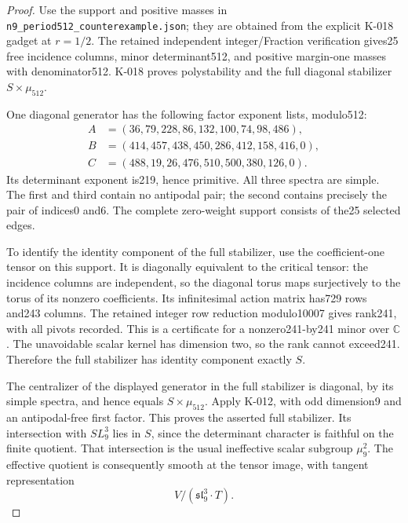 \begin{proof}
Use the support and positive masses in
\texttt{n9\_period512\_counterexample.json}; they are obtained from
the explicit K-018 gadget at $r=1/2$.  The retained independent
integer/Fraction verification gives25 free incidence columns,
minor determinant512, and positive margin-one masses with
denominator512.  K-018 proves polystability and the full
diagonal stabilizer $S\times\mu_{512}$.

One diagonal generator has the following factor exponent lists,
modulo512:
\[
\begin{aligned}
A&=(36,79,228,86,132,100,74,98,486),\\
B&=(414,457,438,450,286,412,158,416,0),\\
C&=(488,19,26,476,510,500,380,126,0).
\end{aligned}
\]
Its determinant exponent is219, hence primitive.  All three
spectra are simple.  The first and third contain no antipodal
pair; the second contains precisely the pair of indices0 and6.
The complete zero-weight support consists of the25 selected edges.

To identify the identity component of the full stabilizer, use
the coefficient-one tensor on this support.  It is diagonally
equivalent to the critical tensor: the incidence columns are
independent, so the diagonal torus maps surjectively to the torus
of its nonzero coefficients.  Its infinitesimal action matrix
has729 rows and243 columns.  The retained integer row reduction
modulo10007 gives rank241, with all pivots recorded.  This is a
certificate for a nonzero241-by241 minor over $\mathbb C$.
The unavoidable scalar kernel has dimension two, so the rank
cannot exceed241.  Therefore the full stabilizer has identity
component exactly $S$.

The centralizer of the displayed generator in the full stabilizer
is diagonal, by its simple spectra, and hence equals
$S\times\mu_{512}$.  Apply K-012, with odd dimension9 and an
antipodal-free first factor.  This proves the asserted full
stabilizer.  Its intersection with $SL_9^3$ lies in $S$, since
the determinant character is faithful on the finite quotient.
That intersection is the usual ineffective scalar subgroup
$\mu_9^2$.  The effective quotient is consequently smooth at
the tensor image, with tangent representation
\[
                    V/(\mathfrak{sl}_9^3\cdot T).
\]


\end{proof}
